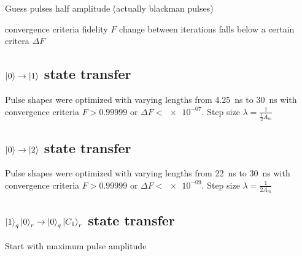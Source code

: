 \documentclass[main.tex]{subfiles}
\begin{document}
Guess pulses half amplitude (actually blackman pulses)

convergence criteria
fidelity \(F\)
change between iterations falls below a certain critera \(\Delta F\)

\subsection{\texorpdfstring{\boldmath\(\ket{0}\rightarrow\ket{1}\)}{0 -> 1} state transfer}
Pulse shapes were optimized with varying lengths from \SI{4.25}{\nano\second} to \SI{30}{\nano\second} with convergence criteria \(F>0.99999\) or \(\Delta F < \num{e-07}\). Step size \(\lambda = \frac{1}{\frac{1}{2}A_{m}}\)

\subsection{\texorpdfstring{\boldmath\(\ket{0}\rightarrow\ket{2}\)}{0 -> 2} state transfer}
Pulse shapes were optimized with varying lengths from \SI{22}{\nano\second} to \SI{30}{\nano\second} with convergence criteria \(F>0.99999\) or \(\Delta F < \num{e-09}\). Step size \(\lambda = \frac{1}{2A_{m}}\)

\subsection{\texorpdfstring{\boldmath\( \ket{1}_q\ket{0}_r\rightarrow\ket{0}_q\ket{C_1}_r \)}{10 -> 0C1} state transfer}

Start with maximum pulse amplitude
\end{document}
